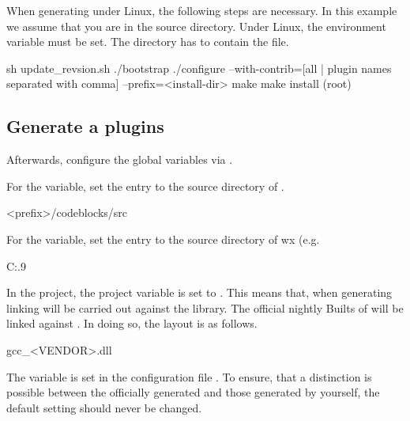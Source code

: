 When generating under Linux, the following steps are necessary. In this example we assume that you are in the \codeblocks source directory.  Under Linux, the environment variable  must be set. The  directory has to contain the  file.



\begin{cmd}
sh update_revsion.sh
./bootstrap
./configure --with-contrib=[all | plugin names separated with comma] --prefix=<install-dir>
make
make install (root)
\end{cmd}

\subsection{Generate a plugins}

Afterwards, configure the global variables via .


For the  variable, set the  entry to the source directory of \codeblocks.

\begin{cmd}
<prefix>/codeblocks/src
\end{cmd}


For the  variable, set the  entry to the source directory of wx (e.g.

\begin{cmd}
C:\Programme{}.9
\end{cmd}

In the \codeblocks project, the project variable  is set to . This means that, when generating \codeblocks linking will be carried out against the  library. The official nightly Builts of \codeblocks will be linked against . In doing so, the layout is as follows.

\begin{code}
gcc_<VENDOR>.dll
\end{code}

The  variable is set in the configuration file . To ensure, that a distinction is possible between the officially generated \codeblocks and those generated by yourself, the default setting  should never be changed.

